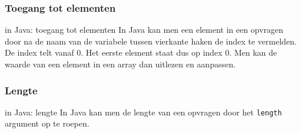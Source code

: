 \subsubsection{Toegang tot elementen}
\begin{frame}[fragile]{\dsarray{} in Java: toegang tot elementen}
In Java kan men een element in een \dsarray{} opvragen door na de naam van de variabele tussen vierkante haken de index te vermelden. De index telt vanaf 0. Het eerste element staat dus op index 0. Men kan de waarde van een element in een array dan uitlezen en aanpassen.
\end{frame}
\subsubsection{Lengte}
\begin{frame}[fragile]{\dsarray{} in Java: lengte}
In Java kan men de lengte van een \dsarray{} opvragen door het \texttt{length} argument op te roepen.
\end{frame}
